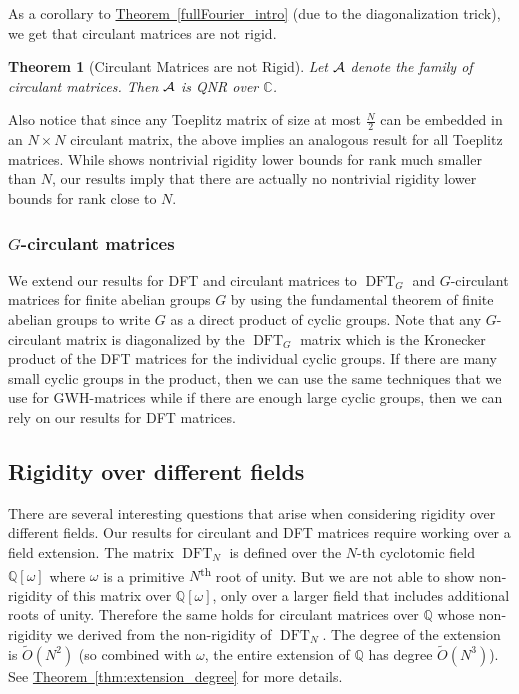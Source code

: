 \documentclass[11pt]{article}
\numberwithin{equation}{section}
\newtheorem{theorem}{Theorem}[section]
\theoremstyle{definition}
\theoremstyle{plain}
\newcommand{\C}{\mathbb C}
\newcommand{\Q}{\mathbb Q}
\newcommand{\expref}[2]{\hyperref[#2]{#1~\ref{#2}}}
\theoremstyle{definition}
\renewcommand\Q{{\mathbb{Q}}}
\renewcommand\C{{\mathbb{C}}}
\newcommand{\ts}{\textsuperscript}
\DeclareMathOperator{\DFT}{DFT}
\begin{document}
%
As a corollary to
%
%
%
\expref{Theorem}{fullFourier_intro}  
(due to the diagonalization trick), we get that circulant matrices are not rigid.
\begin{theorem}[Circulant Matrices are not Rigid]\label{circulant_intro}
Let $\cal A$ denote the family of circulant matrices.  Then $\cal A$ is QNR over $\C$.
\end{theorem}

Also notice that since any Toeplitz matrix of size at most $\frac{N}{2}$ can be embedded in an $N \times N$ circulant matrix, the above implies an analogous result for all Toeplitz matrices.  While \cite{toeplitz} shows nontrivial rigidity lower bounds for rank much smaller than $N$, our results imply that there are actually no nontrivial rigidity lower bounds for rank close to $N$.
%

%
\subsubsection{\texorpdfstring{$G$}{G}-circulant matrices}
We extend our results for DFT and circulant matrices to
$\DFT_G$ and %
$G$-circulant matrices
for finite abelian groups $G$ %
by using the fundamental theorem of finite abelian groups to write $G$ as a direct product of cyclic groups.  Note that any $G$-circulant matrix is diagonalized by the $\DFT_G$ matrix which is %
the Kronecker product of the DFT matrices for the individual cyclic groups.  If there are many small cyclic groups in the product, then we can use the same techniques that we use for GWH-matrices while if there are enough large cyclic groups, then we can rely on our results for DFT matrices.
%

%
\subsection{Rigidity over different fields}\label{sec:differentfield}
%
There are several interesting questions that arise when considering
rigidity over different fields.
Our results for circulant and DFT matrices require working over a
field extension.
%
%
%
%
%
%
%
%
The matrix $\DFT_N$ is defined over the $N$-th cyclotomic field
$\Q[\omega]$ where $\omega$ is a primitive $N$\ts{th} root of unity.
But we are not able to show non-rigidity of this matrix over
$\Q[\omega]$, only over a larger field that includes additional
roots of unity.  Therefore the same holds for circulant matrices
over $\Q$ whose non-rigidity we derived from the non-rigidity of
$\DFT_N$.  %
The degree of the extension is
%
%
$\tilde{O}(N^2)$ (so combined with $\omega$, the entire extension of $\Q$ has degree $\tilde{O}(N^3)$). See \expref{Theorem}{thm:extension_degree} for more details.
%
  
\end{document}
